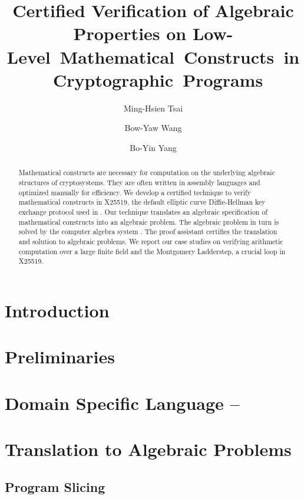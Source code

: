 \documentclass{llncs}
\title{Certified Verification of Algebraic Properties on
Low- \mbox{Level Mathematical Constructs in Cryptographic Programs}}
\author{
Ming-Hsien Tsai
\and
Bow-Yaw Wang
\and
Bo-Yin Yang
%
}
\institute
{
Institute of Information Science\\
Academia Sinica\\
128 Section 2 Academia Road, Taipei 115-29, Taiwan\\
\email{mhtsai208@gmail.com, bywang@iis.sinica.edu.tw, by@crypto.tw}
}
\author{\vspace*{-1cm}}
\institute{\vspace*{-1cm}\ }
\begin{document}
\maketitle

\begin{abstract}
  Mathematical constructs are necessary for computation on the
  underlying algebraic structures of cryptosystems. They are often
  written in assembly languages and optimized manually for
  efficiency. We develop a certified technique to verify mathematical
  constructs in X25519, the default elliptic curve Diffie-Hellman key
  exchange protocol used in \openssh. Our technique translates an
  algebraic specification of mathematical constructs into an algebraic
  problem. The algebraic 
  problem in turn is solved by the computer algebra system \singular. 
  The proof assistant 
  \coq certifies the translation and solution to algebraic
  problems. We report our case studies on verifying
  arithmetic computation over a large finite field and
  the Montgomery Ladderstep, a crucial loop  in X25519.
\end{abstract}

\section{Introduction}
\label{section:introduction}


\section{Preliminaries}
\label{section:preliminaries}


\section{Domain Specific Language -- \mydsl}
\label{section:domain-specific-language}


\section{Translation to Algebraic Problems}
\label{section:translation}


\subsection{Program Slicing}
\label{subsection:translation:slicing}

\end{document}
